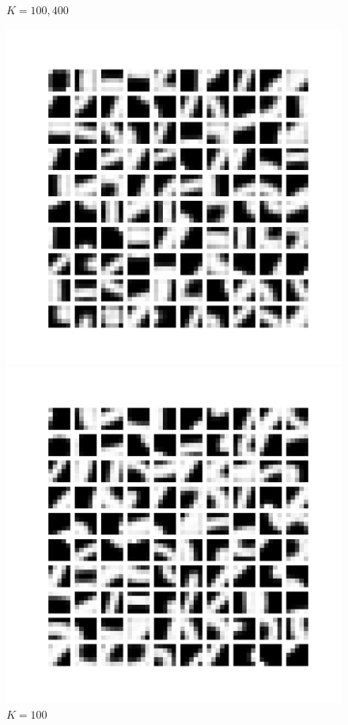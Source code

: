 \documentclass{article}
\begin{document}
\begin{itemize}
\begin{figure}[htbp!]
\item $K = 100, 400$
    \centering
    \begin{minipage}{0.4\textwidth}
        \centering
        \includegraphics[width=\textwidth]{K-means/Result/Centroids/100-clusters-centroids.png}
        \caption{$K = 100$}
        \label{fig:100-centroids}
    \end{minipage}%
    \begin{minipage}{0.4\textwidth}
        \centering
        \includegraphics[width=\textwidth]{K-means/Result/Centroids/400-clusters-centroids.png}

\end{minipage}
\end{figure}
\end{itemize}
\end{document}
